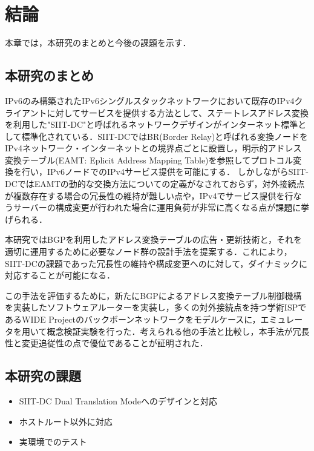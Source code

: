 \chapter{結論}
\label{conclusion}

本章では，本研究のまとめと今後の課題を示す．

\section{本研究のまとめ}
IPv6のみ構築されたIPv6シングルスタックネットワークにおいて既存のIPv4クライアントに対してサービスを提供する方法として、ステートレスアドレス変換を利用した"SIIT-DC"と呼ばれるネットワークデザインがインターネット標準として標準化されている．SIIT-DCではBR(Border Relay)と呼ばれる変換ノードをIPv4ネットワーク・インターネットとの境界点ごとに設置し，明示的アドレス変換テーブル(EAMT: Eplicit Address Mapping Table)を参照してプロトコル変換を行い，IPv6ノードでのIPv4サービス提供を可能にする．
しかしながらSIIT-DCではEAMTの動的な交換方法についての定義がなされておらず，対外接続点が複数存在する場合の冗長性の維持が難しい点や，IPv4でサービス提供を行なうサーバーの構成変更が行われた場合に運用負荷が非常に高くなる点が課題に挙げられる．

本研究ではBGPを利用したアドレス変換テーブルの広告・更新技術と，それを適切に運用するために必要なノード群の設計手法を提案する．これにより，SIIT-DCの課題であった冗長性の維持や構成変更へのに対して，ダイナミックに対応することが可能になる．

この手法を評価するために，新たにBGPによるアドレス変換テーブル制御機構を実装したソフトウェアルーターを実装し，多くの対外接続点を持つ学術ISPであるWIDE Projectのバックボーンネットワークをモデルケースに，エミュレータを用いて概念検証実験を行った．考えられる他の手法と比較し，本手法が冗長性と変更追従性の点で優位であることが証明された．

\section{本研究の課題}

\begin{itemize}
    \item SIIT-DC Dual Translation Modeへのデザインと対応\\
    \item ホストルート以外に対応
    \item 実環境でのテスト
    
\end{itemize}


